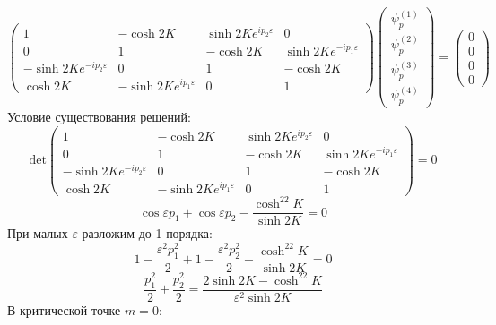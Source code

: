 \documentclass[12pt]{article}
\theoremstyle{definition}
\begin{document}
\begin{enumerate}
\begin{itemize}
\begin{equation*}
        \begin{pmatrix}
            1 & -\cosh2K & \sinh2Ke^{ip_2\varepsilon} & 0\\
            0 & 1 & -\cosh2K & \sinh2Ke^{-ip_1\varepsilon}\\
            -\sinh2Ke^{-ip_2\varepsilon} & 0 & 1 & -\cosh2K\\
            \cosh2K & -\sinh2Ke^{ip_1\varepsilon} & 0 & 1
        \end{pmatrix}\begin{pmatrix}
            \psi_p^{(1)}\\
            \psi_p^{(2)}\\
            \psi_p^{(3)}\\
            \psi_p^{(4)}
        \end{pmatrix}=\begin{pmatrix}
            0\\
            0\\
            0\\
            0
        \end{pmatrix}
    \end{equation*}
    Условие существования решений:
    \begin{equation}
        \text{det}\begin{pmatrix}
            1 & -\cosh2K & \sinh2Ke^{ip_2\varepsilon} & 0\\
            0 & 1 & -\cosh2K & \sinh2Ke^{-ip_1\varepsilon}\\
            -\sinh2Ke^{-ip_2\varepsilon} & 0 & 1 & -\cosh2K\\
            \cosh2K & -\sinh2Ke^{ip_1\varepsilon} & 0 & 1
        \end{pmatrix}=0
    \end{equation}
    \begin{equation}
        \cos\varepsilon p_1+\cos\varepsilon p_2-\frac{\cosh^22K}{\sinh2K}=0
    \end{equation}
    При малых $\varepsilon$ разложим до 1 порядка:
    \begin{equation}
        1-\frac{\varepsilon^2p_1^2}{2}+1-\frac{\varepsilon^2p_2^2}{2}-\frac{\cosh^22K}{\sinh2K}=0
    \end{equation}
    \begin{equation}
        \frac{p_1^2}{2}+\frac{p_2^2}{2}=\frac{2\sinh2K-\cosh^22K}{\varepsilon^2\sinh2K}
    \end{equation}
    В критической точке $m=0$:
    \begin{equation}

\end{equation}
\end{itemize}
\end{enumerate}
\end{document}
